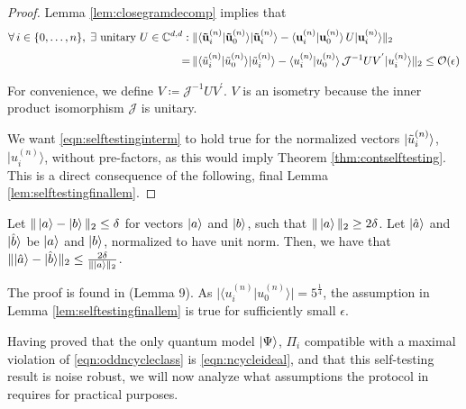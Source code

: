 \begin{proof}
Lemma \ref{lem:closegramdecomp} implies that 
\begin{align}
\label{eqn:selftestinginterm}
\begin{split}
    \forall\thinspace i\in\{0,\dots,n\},\; \exists \text{ unitary } U\in\mathbb{C}^{d,d}: \; & \| \langle \mathbf{\Tilde{u}}_i^{(n)} \vert \mathbf{\Tilde{u}}_0^{(n)} \rangle \vert \mathbf{\Tilde{u}}_i^{(n)} \rangle - \langle \mathbf{u}_i^{(n)} \vert \mathbf{u}_0^{(n)} \rangle \thinspace U\vert \mathbf{u}_i^{(n)}\rangle\|_2 \\[0.3em]
    = \thinspace & \| \langle \Tilde{u}_i^{(n)} \vert \Tilde{u}_0^{(n)} \rangle \vert \Tilde{u}_i^{(n)} \rangle - \langle u_i^{(n)} \vert u_0^{(n)} \rangle \thinspace \mathcal{J}^{-1}UV^{'} \vert u_i^{(n)}\rangle\|_2 \leq \mathcal{O}(\epsilon)
\end{split}
\end{align}

For convenience, we define $V\coloneqq \mathcal{J}^{-1}UV^{'}$. $V$ is an isometry because the inner product isomorphism $\mathcal{J}$ is unitary. 

We want \ref{eqn:selftestinginterm} to hold true for the normalized vectors $\vert \Tilde{u}_i^{(n)} \rangle$, $\vert u_i^{(n)}\rangle$, without pre-factors, as this would imply Theorem \ref{thm:contselftesting}. This is a direct consequence of the following, final Lemma \ref{lem:selftestingfinallem}.
\end{proof}

\begin{lemma}
\label{lem:selftestingfinallem}
Let $\| \ket{a} - \ket{b} \|_2\leq\delta$ for vectors $\ket{a}$ and $\ket{b}$, such that $\|\ket{a}\|_2\geq2\delta$. Let $\vert \Hat{a} \rangle$ and $\vert \Hat{b} \rangle$ be $\ket{a}$ and $\ket{b}$, normalized to have unit norm. Then, we have that $\| \vert \Hat{a}\rangle-\vert \Hat{b} \rangle \|_2\leq \frac{2\delta}{\|\ket{a}\|_2}$.
\end{lemma}
The proof is found in \cite{Lemma} (Lemma 9). As $\vert \langle u_i^{(n)}\vert u_0^{(n)} \rangle \vert =5^{\frac{1}{4}}$, the assumption in Lemma \ref{lem:selftestingfinallem} is true for sufficiently small $\epsilon$.

Having proved that the only quantum model $\ket{\Psi}$, $\Pi_i$ compatible with a maximal violation of \ref{eqn:oddncycleclass} is \ref{eqn:ncycleideal}, and that this self-testing result is noise robust, we will now analyze what assumptions the protocol in \cite{Bharti2019} requires for practical purposes.

